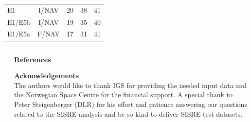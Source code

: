 \documentclass{beamer}
\begin{document}
\begin{frame}[t]
\begin{columns}
\begin{column}[t]{.28\textwidth}
\begin{table}
\begin{tabular}{lcccc}
        \hline
        E1     & I/NAV & 20 & 38 & 41\\
        E1/E5b & I/NAV & 19 & 35 & 40\\
        E1/E5a & F/NAV & 17 & 31 & 41\\
        \hline
        \end{tabular}
     \end{table}


    \end{column}
   \end{columns}



  \vspace*{1cm}
  \begin{columns}
    \begin{column}[t]{.15\textwidth}
    \end{column}

    \begin{column}[t]{.82\textwidth}
      \begin{block}{}%
        \vspace*{-1cm}                   %
        \begin{minipage}{.98\textwidth}  %
          \begin{multicols}{4}
            {\normalsize\bfseries References}\\
            
            \columnbreak

            {\normalsize\bfseries Acknowledgements}\\

            The authors would like to thank IGS for providing the needed input data and the Norwegian Space Centre for the financial support. A special thank to Peter Steigenberger (DLR) for his effort and patience answering our questions related to the SISRE analysis and be so kind to deliver SISRE test datasets. 
          \end{multicols}
        \end{minipage}
      \end{block}
    \end{column}
  \end{columns}
\end{frame}
\end{document}
